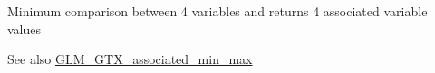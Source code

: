 Minimum comparison between 4 variables and returns 4 associated variable values \begin{DoxySeeAlso}{See also}
\hyperlink{group__gtx__associated__min__max}{G\+L\+M\+\_\+\+G\+T\+X\+\_\+associated\+\_\+min\+\_\+max} 
\end{DoxySeeAlso}

